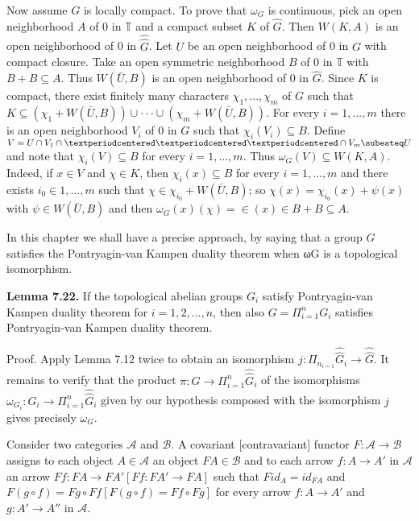 \documentclass[12pt]{article}
\begin{document}
\begin{itemize}
\begin{itemize}
    Now assume $G$ is locally compact. To prove that $\omega_G$ is continuous, pick an open neighborhood $A$ of 0 in $\mathbb{T}$ and
a compact subset $K$ of $\hat{G}$. Then $W(K, A)$ is an open neighborhood of 0 in $\hat{\hat{G}}$. Let $U$ be an open neighborhood of
0 in $G$ with compact closure. Take an open symmetric neighborhood $B$ of 0 in $\mathbb{T}$ with $B+B \subseteq A$. Thus $W(\bar{U}, B)$
is an open neighborhood of 0 in $\hat{G}$. Since $K$ is compact, there exist finitely many characters $\chi_1, . . . , \chi_m$ of $G$
such that $K \subseteq (\chi_1 + W(\bar{U}, B)) \cup · · · \cup (\chi_m + W(\bar{U}, B))$. For every $i = 1, . . . , m$ there is an open neighborhood
$V_i$ of 0 in $G$ such that $\chi_i(V_i) \subseteq B$. Define $V = U \cap V_1 \cap · · · \cap V_m \subesteq U$ and note that $\chi_i(V ) \subseteq B$ for every
$i = 1, . . . , m$. Thus $\omega_G(V ) \subseteq W(K, A)$. Indeed, if $x \in V$ and $\chi \in K$, then $\chi_i(x) \subseteq B$ for every $i = 1, . . . , m$ and
there exists $i_0 \in {1, . . . , m}$ such that $\chi \in \chi_{i_0} + W(\bar{U}, B)$; so $\chi(x) = \chi_{i_0} (x) + \psi (x)$ with $\psi \in W(\bar{U}, B)$ and then
$\omega_G(x)(\chi) = \in(x) \in B + B \subseteq A$.


    In this chapter we shall have a precise approach, by saying that a group $G$ satisfies the Pontryagin-van
Kampen duality theorem when ωG is a topological isomorphism.


\textbf{Lemma 7.22.} If the topological abelian groups $G_i$ satisfy Pontryagin-van Kampen duality theorem for
$i = 1, 2, . . . , n$, then also $G =\Pi^{n}_{i=1} G_i$ satisfies Pontryagin-van Kampen duality theorem.


    Proof. Apply Lemma 7.12 twice to obtain an isomorphism $j : \Pi_n_{i=1} \hat{\hat{G}}_i \to \hat{\hat{G}}$. It remains to verify that the
product $\pi : G \to \Pi^n_{i=1} \hat{\hat{G}}_i$ of the isomorphisms $\omega_{G_i}: G_i \to \Pi^n_{i=1} \hat{\hat{G}}_i$ given by our hypothesis composed with the
isomorphism $j$ gives precisely $\omega_G$.


    Consider two categories $\mathcal{A}$ and $\mathcal{B}$. A covariant [contravariant] functor $F : \mathcal{A} \to \mathcal{B}$ assigns to each object
$A \in \mathcal{A}$ an object $F A \in \mathcal{B}$ and to each arrow $f : A \to A'$ in $\mathcal{A}$ an arrow $F f : F A \to F A'[F f : F A' \to F A]$ such
that $F id_A = id_{FA}$ and $F(g \circ f) = F g \circ F f [F(g \circ f) = F f \circ F g]$ for every arrow $f : A \to A'$ and $g : A' → A''$
in $\mathcal{A}$.



\end{itemize}
\end{itemize}
\end{document}
